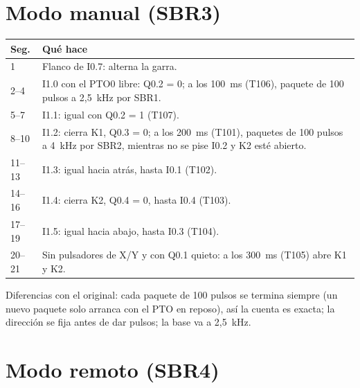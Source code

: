 \section{Modo manual (SBR3)}
\begin{center}\small
\begin{longtable}{>{\raggedright}p{1.4cm} >{\raggedright\arraybackslash}p{13.6cm}}
\toprule
\textbf{Seg.} & \textbf{Qué hace}\\
\midrule
\endhead
1 & Flanco de I0.7: alterna la garra.\\
2--4 & I1.0 con el PTO0 libre: Q0.2 = 0; a los 100~ms (T106), paquete de 100 pulsos a 2,5~kHz por SBR1.\\
5--7 & I1.1: igual con Q0.2 = 1 (T107).\\
8--10 & I1.2: cierra K1, Q0.3 = 0; a los 200~ms (T101), paquetes de 100 pulsos a 4~kHz por SBR2, mientras no se pise I0.2 y K2 esté abierto.\\
11--13 & I1.3: igual hacia atrás, hasta I0.1 (T102).\\
14--16 & I1.4: cierra K2, Q0.4 = 0, hasta I0.4 (T103).\\
17--19 & I1.5: igual hacia abajo, hasta I0.3 (T104).\\
20--21 & Sin pulsadores de X/Y y con Q0.1 quieto: a los 300~ms (T105) abre K1 y K2.\\
\bottomrule
\end{longtable}
\end{center}
Diferencias con el original: cada paquete de 100 pulsos se termina siempre (un nuevo paquete solo arranca con el PTO en reposo), así la cuenta es exacta; la dirección se fija antes de dar pulsos; la base va a 2,5~kHz.

\section{Modo remoto (SBR4)}
